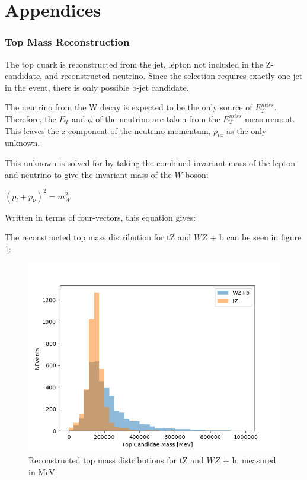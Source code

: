 \documentclass[NOTE, atlasdraft=true, texlive=2016, UKenglish]{\ATLASLATEXPATH atlasdoc}
\begin{document}


\clearpage
\appendix
\part*{Appendices}

\section{Top Mass Reconstruction}
\label{sec:topMass}

The top quark is reconstructed from the jet, lepton not included in the Z-candidate, and reconstructed neutrino. Since the selection requires exactly one jet in the event, there is only possible b-jet candidate. 

The neutrino from the W decay is expected to be the only source of $E_T^{miss}$. Therefore, the $E_T$ and $\phi$ of the neutrino are taken from the $E_T^{miss}$ measurement. This leaves the z-component of the neutrino momentum, $p_{\nu z}$ as the only unknown. 

This unknown is solved for by taking the combined invariant mass of the lepton and neutrino to give the invariant mass of the $W$ boson:

\begin{center}
   $(p_l + p_{\nu})^2 = m_W^2$ \\ 
\end{center} 

Written in terms of four-vectors, this equation gives:

The reconstructed top mass distribution for tZ and $WZ$ + b can be seen in figure \ref{fig:topMass}:

\begin{figure}[H]
    \centering
    \includegraphics[width=0.7\linewidth]{tZ_bdt/topMass.png}
    \caption{Reconstructed top mass distributions for tZ and $WZ$ + b, measured in MeV.}
    \label{fig:topMass}
\end{figure}

\end{document}
